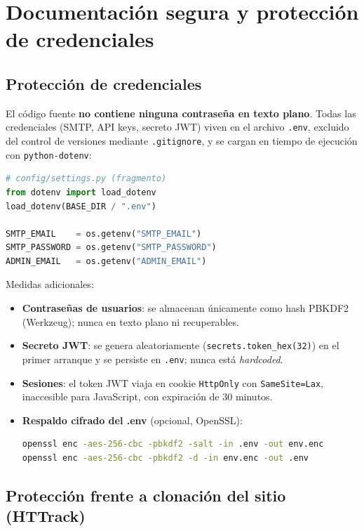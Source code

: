 \documentclass[12pt,letterpaper]{report}
\begin{document}
\chapter{Documentación segura y protección de credenciales}
\label{cap:seguridad}

\section{Protección de credenciales}

El código fuente \textbf{no contiene ninguna contraseña en texto plano}.
Todas las credenciales (SMTP, API keys, secreto JWT) viven en el archivo
\texttt{.env}, excluido del control de versiones mediante
\texttt{.gitignore}, y se cargan en tiempo de ejecución con
\texttt{python-dotenv}:

\begin{lstlisting}[language=Python]
# config/settings.py (fragmento)
from dotenv import load_dotenv
load_dotenv(BASE_DIR / ".env")

SMTP_EMAIL    = os.getenv("SMTP_EMAIL")
SMTP_PASSWORD = os.getenv("SMTP_PASSWORD")
ADMIN_EMAIL   = os.getenv("ADMIN_EMAIL")
\end{lstlisting}

Medidas adicionales:
\begin{itemize}[nosep]
  \item \textbf{Contraseñas de usuarios}: se almacenan únicamente como hash
        PBKDF2 (Werkzeug); nunca en texto plano ni recuperables.
  \item \textbf{Secreto JWT}: se genera aleatoriamente
        (\texttt{secrets.token\_hex(32)}) en el primer arranque y se
        persiste en \texttt{.env}; nunca está \textit{hardcoded}.
  \item \textbf{Sesiones}: el token JWT viaja en cookie \texttt{HttpOnly}
        con \texttt{SameSite=Lax}, inaccesible para JavaScript, con
        expiración de 30 minutos.
  \item \textbf{Respaldo cifrado del .env} (opcional, OpenSSL):
\begin{lstlisting}[language=bash]
openssl enc -aes-256-cbc -pbkdf2 -salt -in .env -out env.enc
openssl enc -aes-256-cbc -pbkdf2 -d -in env.enc -out .env
\end{lstlisting}
\end{itemize}

\section{Protección frente a clonación del sitio (HTTrack)}
\end{document}
